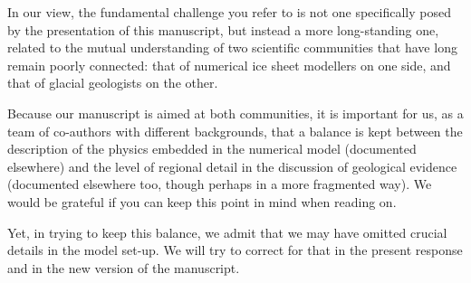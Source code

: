 In our view, the fundamental challenge you refer to is not one specifically
posed by the presentation of this manuscript, but instead a more long-standing
one, related to the mutual understanding of two scientific communities that
have long remain poorly connected: that of numerical ice sheet modellers on one
side, and that of glacial geologists on the other.

Because our manuscript is aimed at both communities, it is important for us, as
a team of co-authors with different backgrounds, that a balance is kept between
the description of the physics embedded in the numerical model (documented
elsewhere) and the level of regional detail in the discussion of geological
evidence (documented elsewhere too, though perhaps in a more fragmented way).
We would be grateful if you can keep this point in mind when reading on.

Yet, in trying to keep this balance, we admit that we may have omitted crucial
details in the model set-up. We will try to correct for that in the present
response and in the new version of the manuscript.


